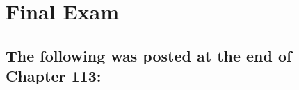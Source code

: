 














\chapter{Final Exam}

\section{The following was posted at the end of Chapter 113:}

